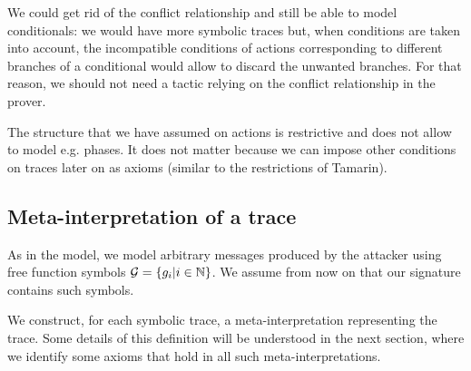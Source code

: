 \begin{remark}
  We could get rid of the conflict relationship and still be able to
  model conditionals: we would have more symbolic traces but, when conditions
  are taken into account, the incompatible conditions of actions corresponding
  to different branches of a conditional would allow to discard
  the unwanted branches. For that reason, we should not need a tactic
  relying on the conflict relationship in the prover.
\end{remark}

\begin{remark}
  The structure that we have assumed on actions is restrictive and
  does not allow to model e.g. phases. It does not matter because we can
  impose other conditions on traces later on as axioms (similar to the 
  restrictions of Tamarin).
\end{remark}

\subsection{Meta-interpretation of a trace}

As in the \BC model, we model arbitrary messages produced by the attacker 
using free function symbols $\mathcal{G} = \{g_i | i \in \mathbb{N}\}$. We assume
from now on that our signature contains such symbols.

We construct, for each symbolic trace, a meta-interpretation representing
the trace. Some details of this definition will be understood in the next
section, where we identify some axioms that hold in all such 
meta-interpretations.

